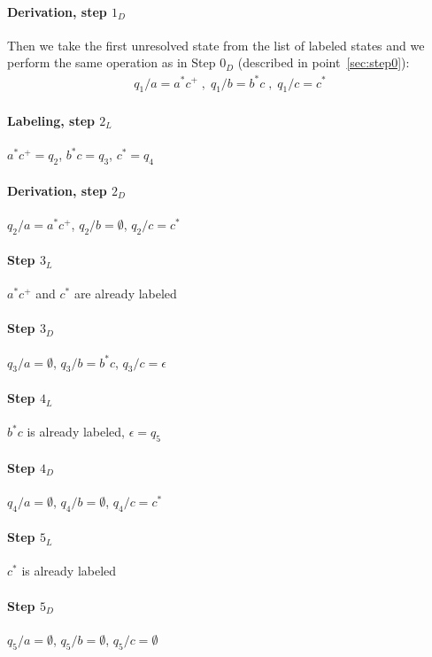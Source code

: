 \documentclass{article}
\begin{document}
\paragraph{Derivation, step $1_D$}
Then we take the first unresolved state from the list of labeled states and we perform the same
operation as in Step $0_D$ (described in point~\ref{sec:step0}):
\begin{gather*}
q_1 / a = a^*c^+ \; , \;
q_1 / b = b^*c \; , \;
q_1 / c = c^*
\end{gather*}

\begin{multicols}{2}

\paragraph{Labeling, step $2_L$} $a^*c^+ = q_2$, $b^*c = q_3$, $c^* = q_4$

\paragraph{Derivation, step $2_D$} $q_2 / a = a^*c^+$, $q_2 / b = \emptyset$, $q_2 / c = c^*$

\paragraph{Step $3_L$} $a^*c^+$ and $c^*$ are already labeled

\paragraph{Step $3_D$} $q_3 / a = \emptyset$, $q_3 / b = b^*c$, $q_3 / c = \epsilon$

\paragraph{Step $4_L$} $b^*c$ is already labeled, $\epsilon = q_5$

\paragraph{Step $4_D$} $q_4 / a = \emptyset$, $q_4 / b = \emptyset$, $q_4 / c = c^*$

\paragraph{Step $5_L$} $c^*$ is already labeled

\paragraph{Step $5_D$} $q_5 / a = \emptyset$, $q_5 / b = \emptyset$, $q_5 / c = \emptyset$


\end{multicols}
\end{document}
